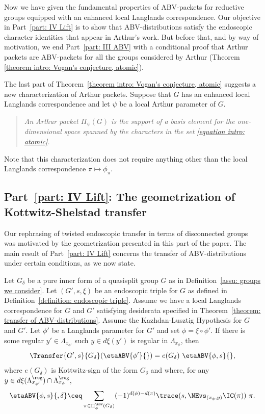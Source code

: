 \documentclass[11pt,letterpaper]{amsart}
\numberwithin{equation}{section}
\begin{document}
Now we have given the fundamental properties of ABV-packets for reductive groups equipped with an enhanced local Langlands correspondence. 
Our objective in Part~\ref{part: IV Lift} is to show that ABV-distributions satisfy the endoscopic character identities that appear in Arthur's work. 
But before that, and by way of motivation, we end Part~\ref{part: III ABV} with a conditional proof that Arthur packets are ABV-packets for all the groups considered by Arthur (Theorem \ref{theorem intro: Vogan's conjecture, atomic}). 



The last part of Theorem~\ref{theorem intro: Vogan's conjecture, atomic} suggests a new characterization of Arthur packets.
Suppose that $G$ has an enhanced local Langlands correspondence and let $\psi$ be a local Arthur parameter of $G$.
\begin{quotation}
{\it An Arthur packet $\Pi_{\psi}(G)$ is the support of a basis element for the one-dimensional space spanned by the characters in the set \eqref{equation intro: atomic}.}
\end{quotation}
Note that this characterization does not require anything other than the local Langlands correspondence $\pi \mapsto \phi_{\pi}$.

\subsection{Part~\ref{part: IV Lift}: The geometrization of Kottwitz-Shelstad transfer} 

Our rephrasing of twisted endoscopic transfer in terms of disconnected groups was motivated by the geometrization presented in this part of the paper.
The main result of Part~\ref{part: IV Lift} concerns the transfer of ABV-distributions under certain conditions, as we now state.


\begin{theorem}\label{theorem intro: transfer of ABV-distributions}
Let $G_\delta$ be a pure inner form of a quasisplit group $G$ as in Definition~\ref{assu: groups we consider}. 
Let $(G',s,\xi)$ be an endoscopic triple for $G$ as defined in Definition~\ref{definition: endoscopic triple}.
Assume we have a local Langlands correspondence for $G$ and $G'$ satisfying desiderata specified in Theorem~\ref{theorem: transfer of ABV-distributions}. 
Assume the Kazhdan-Lusztig Hypothesis for $G$ and $G'$.
Let $\phi'$ be a Langlands parameter for $G'$ and set $\phi = \xi\circ\phi'$.
If there is some regular $y'\in \Lambda_{x_{\phi'}}$ such $y\in d\xi(y')$ is regular in $\Lambda_{x_\phi}$, then
\[
\Transfer{G',s}{G_\delta}
(\etaABV{\phi'}{})
=
e(G_\delta)\ 
\etaABV{\phi,s}{},
\]
where $e(G_\delta)$ is Kottwitz-sign of the form $G_\delta$ and where, for any $y\in d\xi(\Lambda_{x_{\phi'}}^\reg) \cap \Lambda_{x_\phi}^\reg$,
\[
\etaABV{\phi,s}{,\delta}
\ceq
\sum_{\pi\in \Pi_\phi^\ABV(G_\delta)}
(-1)^{d(\phi)-d(\pi)}
\trace(s,\NEvs_{(x_\phi,y)}\IC(\pi))\ \pi.
\]
\end{theorem}
\end{document}
